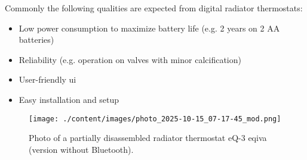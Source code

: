 Commonly the following qualities are expected from digital radiator thermostats:

\begin{itemize}
	\item Low power consumption to maximize battery life (e.g. 2 years on 2 AA batteries)
	\item Reliability (e.g. operation on valves with minor calcification)
	\item User-friendly \ac{ui}
	\item Easy installation and setup
\end{itemize}

\begin{figure}[htbp]
	\centering
	\texttt{[image: ./content/images/photo\_2025-10-15\_07-17-45\_mod.png]}
	\caption{Photo of a partially disassembled radiator thermostat eQ-3 eqiva (version without Bluetooth).}
	\label{fig:rt-photo}
\end{figure}